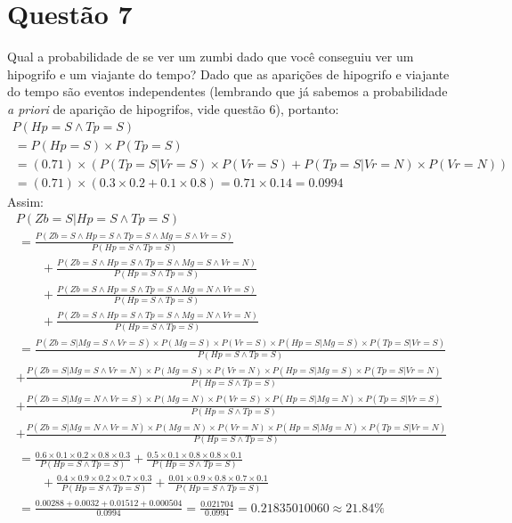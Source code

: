 \documentclass{article}
\begin{document}
    \section*{Questão 7}
        Qual a probabilidade de se ver um zumbi dado que você
        conseguiu ver um hipogrifo e um viajante do tempo?
        Dado que as aparições de hipogrifo e viajante do tempo
        são eventos independentes (lembrando que já sabemos a
        probabilidade \textit{a priori} de aparição de hipogrifos,
        vide questão 6), portanto:
        \begin{gather*}
            P(Hp=S \land Tp=S) \\
            \,= P(Hp=S) \times P(Tp=S) \\
            \,= (0.71) \times 
                (P(Tp=S|Vr=S) \times P(Vr=S) + P(Tp=S|Vr=N) \times P(Vr=N)) \\
            \,= (0.71) \times (0.3 \times 0.2 + 0.1 \times 0.8)
                = 0.71 \times 0.14 = 0.0994
        \end{gather*}
        Assim:
        \begin{gather*}
            P(Zb=S|Hp=S \land Tp=S) \\
            \,= \frac{P(Zb=S \land Hp=S \land Tp=S \land Mg=S \land Vr=S)}
                {P(Hp=S \land Tp=S)} \\
            \qquad+ \frac{P(Zb=S \land Hp=S \land Tp=S \land Mg=S \land Vr=N)}
                {P(Hp=S \land Tp=S)} \\
            \qquad+ \frac{P(Zb=S \land Hp=S \land Tp=S \land Mg=N \land Vr=S)}
                {P(Hp=S \land Tp=S)} \\
            \qquad+ \frac{P(Zb=S \land Hp=S \land Tp=S \land Mg=N \land Vr=N)}
                {P(Hp=S \land Tp=S)} \\
            \,= \frac{P(Zb=S|Mg=S \land Vr=S) \times P(Mg=S) \times P(Vr=S)
                \times P(Hp=S|Mg=S) \times P(Tp=S|Vr=S)}{P(Hp=S \land Tp=S)} \\
            + \frac{P(Zb=S|Mg=S \land Vr=N) \times P(Mg=S) \times P(Vr=N)
                \times P(Hp=S|Mg=S) \times P(Tp=S|Vr=N)}{P(Hp=S \land Tp=S)} \\
            + \frac{P(Zb=S|Mg=N \land Vr=S) \times P(Mg=N) \times P(Vr=S)
                \times P(Hp=S|Mg=N) \times P(Tp=S|Vr=S)}{P(Hp=S \land Tp=S)} \\
            + \frac{P(Zb=S|Mg=N \land Vr=N) \times P(Mg=N) \times P(Vr=N)
                \times P(Hp=S|Mg=N) \times P(Tp=S|Vr=N)}{P(Hp=S \land Tp=S)} \\
            \,= \frac{0.6 \times 0.1 \times 0.2 \times 0.8 \times 0.3}
                {P(Hp=S \land Tp=S)}
            + \frac{0.5 \times 0.1 \times 0.8 \times 0.8 \times 0.1}
                {P(Hp=S \land Tp=S)} \\
            \qquad+ \frac{0.4 \times 0.9 \times 0.2 \times 0.7 \times 0.3}
                {P(Hp=S \land Tp=S)}
            + \frac{0.01 \times 0.9 \times 0.8 \times 0.7 \times 0.1}
                {P(Hp=S \land Tp=S)} \\
            \,= \frac{0.00288 + 0.0032 + 0.01512 + 0.000504}{0.0994}
            = \frac{0.021704}{0.0994} = 0.21835010060 \approx 21.84\%
        \end{gather*}
\end{document}
